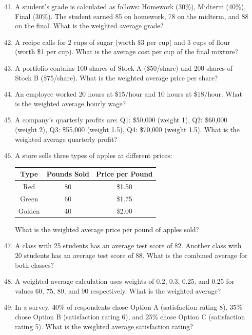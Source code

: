 \documentclass[12pt,a4paper]{article}
\begin{document}
\begin{enumerate}
\setcounter{enumi}{40}

\item A student's grade is calculated as follows: Homework (30\%), Midterm (40\%), Final (30\%). The student earned 85 on homework, 78 on the midterm, and 88 on the final. What is the weighted average grade?

\item A recipe calls for 2 cups of sugar (worth \$3 per cup) and 3 cups of flour (worth \$1 per cup). What is the average cost per cup of the final mixture?

\item A portfolio contains 100 shares of Stock A (\$50/share) and 200 shares of Stock B (\$75/share). What is the weighted average price per share?

\item An employee worked 20 hours at \$15/hour and 10 hours at \$18/hour. What is the weighted average hourly wage?

\item A company's quarterly profits are: Q1: \$50,000 (weight 1), Q2: \$60,000 (weight 2), Q3: \$55,000 (weight 1.5), Q4: \$70,000 (weight 1.5). What is the weighted average quarterly profit?

\item A store sells three types of apples at different prices:
\begin{center}
\begin{tabular}{|c|c|c|}
\hline
Type & Pounds Sold & Price per Pound \\
\hline
Red & 80 & \$1.50 \\
Green & 60 & \$1.75 \\
Golden & 40 & \$2.00 \\
\hline
\end{tabular}
\end{center}
What is the weighted average price per pound of apples sold?

\item A class with 25 students has an average test score of 82. Another class with 20 students has an average test score of 88. What is the combined average for both classes?

\item A weighted average calculation uses weights of 0.2, 0.3, 0.25, and 0.25 for values 60, 75, 80, and 90 respectively. What is the weighted average?

\item In a survey, 40\% of respondents chose Option A (satisfaction rating 8), 35\% chose Option B (satisfaction rating 6), and 25\% chose Option C (satisfaction rating 5). What is the weighted average satisfaction rating?


\end{enumerate}
\end{document}
